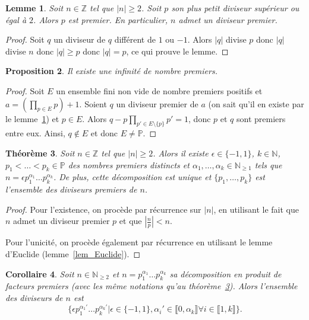 \documentclass[10pt,a4paper]{report}
\newtheorem{thm}{Théorème}[chapter]
\newtheorem{Lem}[thm]{Lemme}
\newtheorem{Prop}[thm]{Proposition}
\newtheorem{Cor}[thm]{Corollaire}
\newcommand{\N}{\mathbb{N}}
\newcommand{\Z}{\mathbb{Z}}
\begin{document}
\begin{Lem}\label{lemExistence_diviseur_premier}
Soit $n\in \Z$ tel que $|n|\geq 2$. Soit $p$ son plus petit diviseur supérieur ou égal à $2$. Alors $p$ est premier. En particulier, $n$ admet un diviseur premier.
\end{Lem}

\begin{proof}
Soit $q$ un diviseur de $q$ différent de $1$ ou $-1$. Alors $|q|$ divise $p$ donc $|q|$ divise $n$ donc $|q|\geq p$ donc $|q|=p$, ce qui prouve le lemme.
\end{proof}

\begin{Prop}
Il existe une infinité de nombre premiers.
\end{Prop}

\begin{proof}
Soit $E$ un ensemble fini non vide de nombre premiers positifs et $a=(\prod_{p\in E} p)+1$. Soient $q$ un diviseur premier de $a$ (on sait qu'il en existe par le lemme~\ref{lemExistence_diviseur_premier}) et $p\in E$. Alors $q-p\prod_{p'\in E\setminus \{p\}} p'=1$, donc $p$ et $q$ sont premiers entre eux. Ainsi, $q\notin E$ et donc $E\neq \mathbb{P}$.
\end{proof}


\begin{thm}\label{thmDécomposition_produit_facteurs_premiers}
Soit $n\in \Z$ tel que $|n|\geq 2$. Alors il existe $\epsilon\in \{-1,1\}$, $k\in \N$, $p_1<\ldots <p_k\in \mathbb{P}$ des nombres premiers distincts et $\alpha_1,\ldots,\alpha_k\in\N_{\geq 1}$ tels que $n=\epsilon p_1^{\alpha_1}\ldots p_k^{\alpha_k}$. De plus, cette décomposition est unique et $\{p_1,\ldots,p_k\}$ est l'ensemble des diviseurs premiers de $n$.
\end{thm}

\begin{proof}
Pour l'existence, on procède par récurrence sur $|n|$, en utilisant le fait que $n$ admet un diviseur premier $p$ et que $|\frac{n}{p}|<n$.

Pour l'unicité, on procède également par récurrence en utilisant le lemme d'Euclide (lemme~\ref{lem_Euclide}).
\end{proof}

\begin{Cor}
Soit $n\in \N_{\geq 2}$ et $n=p_1^{\alpha_1}\ldots p_k^{\alpha_k}$ sa décomposition en produit de facteurs premiers (avec les même notations qu'au théorème~\ref{thmDécomposition_produit_facteurs_premiers}). Alors l'ensemble des diviseurs de $n$ est \[\{\epsilon p_1^{\alpha_1'}\ldots p_k^{\alpha_k'}|\epsilon\in \{-1,1\}, \alpha_i'\in \llbracket 0,\alpha_k\rrbracket\forall i\in \llbracket 1,k\rrbracket\}.\]
\end{Cor}
\end{document}
